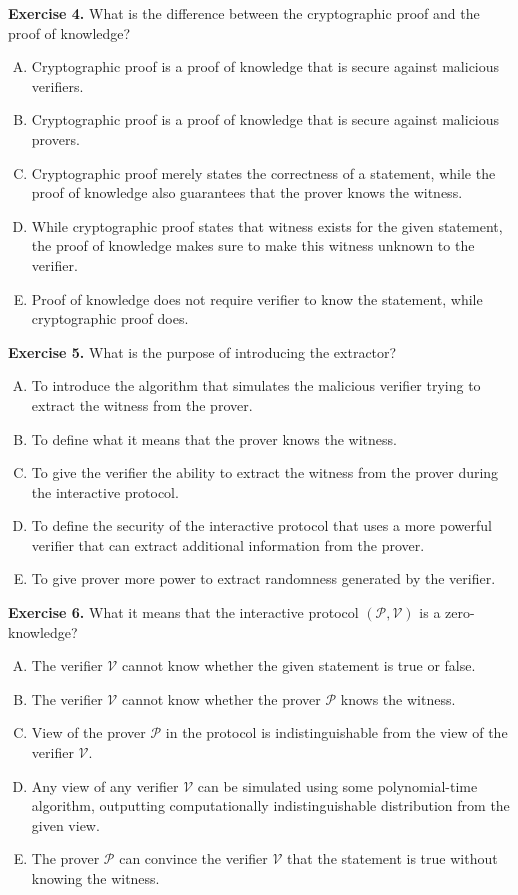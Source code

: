 \documentclass[../lecture-notes.tex]{subfiles}
\begin{document}
\textbf{Exercise 4.} What is the difference between the cryptographic proof and the proof of knowledge?
\begin{enumerate}[(A)]
    \item Cryptographic proof is a proof of knowledge that is secure against malicious verifiers.
    \item Cryptographic proof is a proof of knowledge that is secure against malicious provers.
    \item Cryptographic proof merely states the correctness of a statement, while the proof of knowledge also guarantees that the prover knows the witness.
    \item While cryptographic proof states that witness exists for the given statement, the proof of knowledge makes sure to make this witness unknown to the verifier.
    \item Proof of knowledge does not require verifier to know the statement, while cryptographic proof does.
\end{enumerate}

\textbf{Exercise 5.} What is the purpose of introducing the extractor?
\begin{enumerate}[(A)]
    \item To introduce the algorithm that simulates the malicious verifier trying to extract the witness from the prover.
    \item To define what it means that the prover knows the witness.
    \item To give the verifier the ability to extract the witness from the prover during the interactive protocol.
    \item To define the security of the interactive protocol that uses a more powerful verifier that can extract additional information from the prover.
    \item To give prover more power to extract randomness generated by the verifier.
\end{enumerate}

\textbf{Exercise 6.} What it means that the interactive protocol $(\mathcal{P}, \mathcal{V})$ is a zero-knowledge?
\begin{enumerate}[(A)]
    \item The verifier $\mathcal{V}$ cannot know whether the given statement is true or false.
    \item The verifier $\mathcal{V}$ cannot know whether the prover $\mathcal{P}$ knows the witness.
    \item View of the prover $\mathcal{P}$ in the protocol is indistinguishable from the view of the verifier $\mathcal{V}$.
    \item Any view of any verifier $\mathcal{V}$ can be simulated using some polynomial-time algorithm, outputting computationally indistinguishable distribution from the given view.
    \item The prover $\mathcal{P}$ can convince the verifier $\mathcal{V}$ that the statement is true without knowing the witness.
 \end{enumerate}
\end{document}
